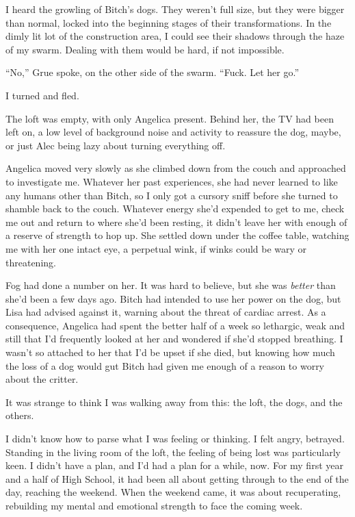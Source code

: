 I heard the growling of Bitch's dogs.  They weren't full size, but they were bigger than normal, locked into the beginning stages of their transformations.  In the dimly lit lot of the construction area, I could see their shadows through the haze of my swarm.  Dealing with them would be hard, if not impossible.



``No,'' Grue spoke, on the other side of the swarm.  ``Fuck.  Let her go.''



I turned and fled.



\blacksquare



The loft was empty, with only Angelica present.  Behind her, the TV had been left on, a low level of background noise and activity to reassure the dog, maybe, or just Alec being lazy about turning everything off.



Angelica moved very slowly as she climbed down from the couch and approached to investigate me.  Whatever her past experiences, she had never learned to like any humans other than Bitch, so I only got a cursory sniff before she turned to shamble back to the couch.  Whatever energy she'd expended to get to me, check me out and return to where she'd been resting, it didn't leave her with enough of a reserve of strength to hop up.  She settled down under the coffee table, watching me with her one intact eye, a perpetual wink, if winks could be wary or threatening.



Fog had done a number on her.  It was hard to believe, but she was \emph{better} than she'd been a few days ago.  Bitch had intended to use her power on the dog, but Lisa had advised against it, warning about the threat of cardiac arrest.  As a consequence, Angelica had spent the better half of a week so lethargic, weak and still that I'd frequently looked at her and wondered if she'd stopped breathing.  I wasn't so attached to her that I'd be upset if she died, but knowing how much the loss of a dog would gut Bitch had given me enough of a reason to worry about the critter.



It was strange to think I was walking away from this: the loft, the dogs, and the others.



I didn't know how to parse what I was feeling or thinking.  I felt angry, betrayed.  Standing in the living room of the loft, the feeling of being lost was particularly keen.  I didn't have a plan, and I'd had a plan for a while, now.  For my first year and a half of High School, it had been all about getting through to the end of the day, reaching the weekend.  When the weekend came, it was about recuperating, rebuilding my mental and emotional strength to face the coming week.



